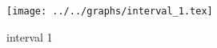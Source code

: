 \begin{figure}[h] \centering\texttt{[image: ../../graphs/interval\_1.tex]}\caption{interval 1}\label{gr:interval_1} \end{figure}
